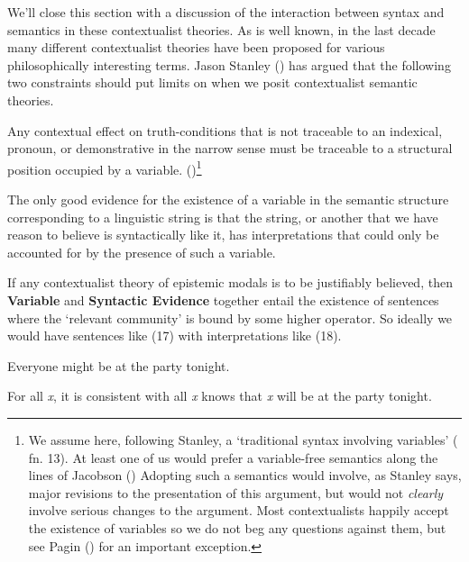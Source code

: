\documentclass[
  10pt,
  letterpaper,
  DIV=11,
  numbers=noendperiod,
  twoside]{scrartcl}
\providecommand{\tightlist}{%
  \setlength{\itemsep}{0pt}\setlength{\parskip}{0pt}}\usepackage{longtable,booktabs,array}
\begin{document}
We'll close this section with a discussion of the interaction between
syntax and semantics in these contextualist theories. As is well known,
in the last decade many different contextualist theories have been
proposed for various philosophically interesting terms. Jason Stanley
() has argued that the following
two constraints should put limits on when we posit contextualist
semantic theories.

\begin{description}
\tightlist
\item[Variable]
Any contextual effect on truth-conditions that is not traceable to an
indexical, pronoun, or demonstrative in the narrow sense must be
traceable to a structural position occupied by a variable.
()\footnote{We
  assume here, following Stanley, a `traditional syntax involving
  variables' ( fn. 13).
  At least one of us would prefer a variable-free semantics along the
  lines of Jacobson () Adopting such a
  semantics would involve, as Stanley says, major revisions to the
  presentation of this argument, but would not \emph{clearly} involve
  serious changes to the argument. Most contextualists happily accept
  the existence of variables so we do not beg any questions against
  them, but see Pagin () for an important
  exception.}
\end{description}

\begin{description}
\tightlist
\item[Syntactic Evidence]
The only good evidence for the existence of a variable in the semantic
structure corresponding to a linguistic string is that the string, or
another that we have reason to believe is syntactically like it, has
interpretations that could only be accounted for by the presence of such
a variable.
\end{description}

If any contextualist theory of epistemic modals is to be justifiably
believed, then \textbf{Variable} and \textbf{Syntactic Evidence}
together entail the existence of sentences where the `relevant
community' is bound by some higher operator. So ideally we would have
sentences like (17) with interpretations like (18).

\begin{description}
\tightlist
\item[(17)]
Everyone might be at the party tonight.
\item[(18)]
For all \emph{x}, it is consistent with all \emph{x} knows that \emph{x}
will be at the party tonight.
\end{description}
\end{document}

